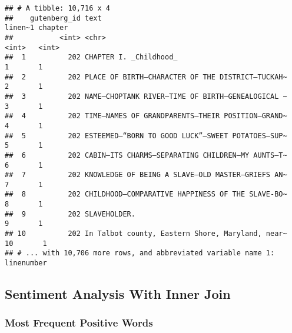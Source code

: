 \documentclass[
]{article}
\begin{document}
\begin{verbatim}
## # A tibble: 10,716 x 4
##    gutenberg_id text                                             linen~1 chapter
##           <int> <chr>                                              <int>   <int>
##  1          202 CHAPTER I. _Childhood_                                 1       1
##  2          202 PLACE OF BIRTH—CHARACTER OF THE DISTRICT—TUCKAH~       2       1
##  3          202 NAME—CHOPTANK RIVER—TIME OF BIRTH—GENEALOGICAL ~       3       1
##  4          202 TIME—NAMES OF GRANDPARENTS—THEIR POSITION—GRAND~       4       1
##  5          202 ESTEEMED—“BORN TO GOOD LUCK”—SWEET POTATOES—SUP~       5       1
##  6          202 CABIN—ITS CHARMS—SEPARATING CHILDREN—MY AUNTS—T~       6       1
##  7          202 KNOWLEDGE OF BEING A SLAVE—OLD MASTER—GRIEFS AN~       7       1
##  8          202 CHILDHOOD—COMPARATIVE HAPPINESS OF THE SLAVE-BO~       8       1
##  9          202 SLAVEHOLDER.                                           9       1
## 10          202 In Talbot county, Eastern Shore, Maryland, near~      10       1
## # ... with 10,706 more rows, and abbreviated variable name 1: linenumber
\end{verbatim}

\hypertarget{sentiment-analysis-with-inner-join-1}{%
\subsection{Sentiment Analysis With Inner
Join}\label{sentiment-analysis-with-inner-join-1}}

\hypertarget{most-frequent-positive-words}{%
\subsubsection{Most Frequent Positive
Words}\label{most-frequent-positive-words}}
\end{document}
